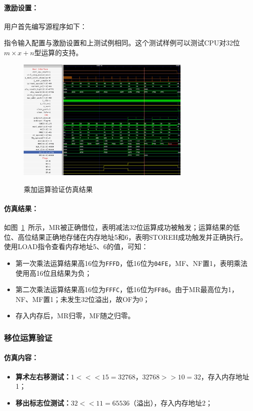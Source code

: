 \documentclass[lang=cn,a4paper,newtx]{elegantpaper}
\begin{document}
\paragraph{激励设置：}
用户首先编写源程序如下：


指令输入配置与激励设置和上测试例相同。这个测试样例可以测试CPU对32位$m\times x +n$型运算的支持。

\begin{figure}[htbp]
  \centering
  \caption{乘加运算验证仿真结果}
  \includegraphics[width = 0.75\textwidth]{figure/cpu_sim_muladd.png}
  \label{fig:sim:2-1}
\end{figure}

\paragraph{仿真结果：}
如图~\ref{fig:sim:2-1}~所示，MR被正确借位，表明减法32位运算成功被触发；运算结果的低位、高位结果正确地存储在内存地址5和6，表明STOREH成功触发并正确执行。使用LOAD指令查看内存地址5、6的值，可知：
\begin{itemize}
  \item 第一次乘法运算结果高16位为\texttt{FFFD}，低16位为\texttt{04FE}，MF、NF置1，表明乘法使用高16位且结果为负；
  \item 第二次乘法运算结果高16位为\texttt{FFFC}，低16位为\texttt{FF86}。由于MR最高位为1，NF、MF置1；未发生32位溢出，故OF为0；
  \item 存入内存后，MR归零，MF随之归零。
\end{itemize}



\subsubsection{移位运算验证}
\paragraph{仿真内容：}
\begin{itemize}
  \item \textbf{算术左右移测试：}$1 <<< 15 = 32768$，$32768 >> 10 = 32$，存入内存地址1；
  \item \textbf{移出标志位测试：}$32 << 11 = 65536$（溢出），存入内存地址2；
\end{itemize}
\end{document}
